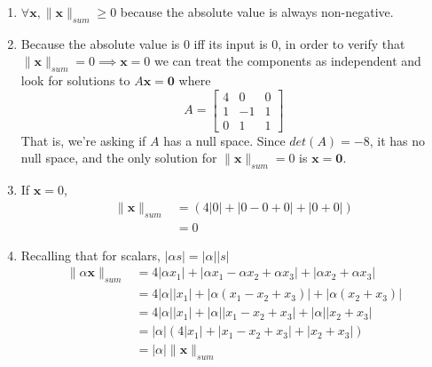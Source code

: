 \documentclass[]{article}
\newcommand{\bbm}{\begin{bmatrix}}
\newcommand{\ebm}{\end{bmatrix}}
\newcommand\nsum[1]{\| #1 \|_{sum}}
\begin{document}
\begin{enumerate}[resume]
\begin{enumerate}
	      \begin{enumerate}
          \item $\forall \bm{x}, \nsum{\bm{x}} \geq 0$ because the
            absolute value is always non-negative.
          \item Because the absolute value is 0 iff its input is 0, in
            order to verify that $\nsum{\bm{x}} = 0 \implies \bm{x} =
            0$ we can treat the components as independent and look for
            solutions to $A \bm{x} = \bm{0}$ where
            \[
            A = \bbm
            4 & 0 & 0 \\
            1 & -1 & 1 \\
            0 & 1 & 1
            \ebm
            \]
            That is, we're asking if $A$ has a null space. Since
            $det(A) = -8$, it has no null space, and the only solution
            for $\nsum{\bm{x}} = 0$ is $\bm{x} = \bm{0}$.
            
          \item If $\bm{x} = 0$,
            \[
            \begin{split}
              \nsum{\bm{x}} &= (4|0| + |0 - 0 + 0| + |0 + 0|) \\
              &= 0
            \end{split}
            \]

          \item Recalling that for scalars, $|\alpha s| = |\alpha| |s|$
            \[ \begin{split}
              \nsum{\alpha \bm{x}} &= 4|\alpha x_1| + |\alpha x_1 - \alpha x_2 + \alpha x_3| + |\alpha x_2 + \alpha x_3| \\
              &= 4|\alpha||x_1| + |\alpha (x_1 - x_2 + x_3)| + |\alpha (x_2 + x_3)| \\
              &= 4|\alpha||x_1| + |\alpha| |x_1 - x_2 + x_3| + |\alpha| |x_2 + x_3| \\
              &= |\alpha| (4|x_1| + |x_1 - x_2 + x_3| + |x_2 + x_3|) \\
              &= |\alpha| \nsum{\bm{x}}
            \end{split} \]


\end{enumerate}
\end{enumerate}
\end{enumerate}
\end{document}
